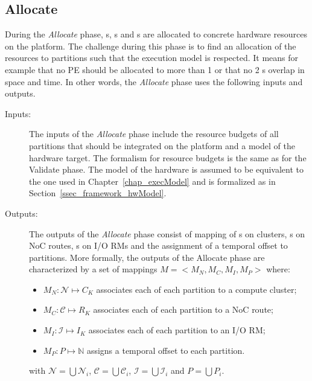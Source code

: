 \documentclass[main.tex]{subfiles}
\begin{document}
\subsection{Allocate}
During the \emph{Allocate} phase, \PN{}s, \PC{}s and \ION{}s are allocated to concrete hardware resources on the platform. The challenge during this phase is to find an allocation of the resources to partitions such that the execution model is respected. It means for example that no PE should be allocated to more than 1 \PN{} or that no 2 \PC{}s overlap in space and time. In other words, the \emph{Allocate} phase uses the following inputs and outputs.
\begin{description}
    \item[Inputs: ]
        The inputs of the \emph{Allocate} phase include the resource budgets of all partitions that should be integrated on the platform and a model of the hardware target. The formalism for resource budgets is the same as for the Validate phase. The model of the hardware is assumed to be equivalent to the one used in Chapter~\ref{chap_execModel} and is formalized as in Section~\ref{ssec_framework_hwModel}. 
    \item[Outputs: ]
        The outputs of the \emph{Allocate} phase consist of mapping of \PN{}s on clusters, \PC{}s on NoC routes, \ION{}s on I/O RMs and the assignment of a temporal offset to partitions. More formally, the outputs of the Allocate phase are characterized by a set of mappings $M = < M_N , M_C , M_I , M_P >$ where:  
        \begin{itemize}
            \item $M_N : \mathcal{N} \mapsto C_K$ associates each \PN{} of each partition to a compute cluster;
            \item $M_C : \mathcal{C} \mapsto R_K$ associates each \PC{} of each partition to a NoC route;
            \item $M_I : \mathcal{I} \mapsto I_K$ associates each \ION{} of each partition to an I/O RM;
            \item $M_P : P \mapsto \mathbb{N}$ assigns a temporal offset to each partition.
        \end{itemize}
        with $\mathcal{N} = \bigcup \mathcal{N}_i$, $\mathcal{C} = \bigcup \mathcal{C}_i$, $\mathcal{I} = \bigcup \mathcal{I}_i$ and $P = \bigcup P_i$.


\end{description}
\end{document}
